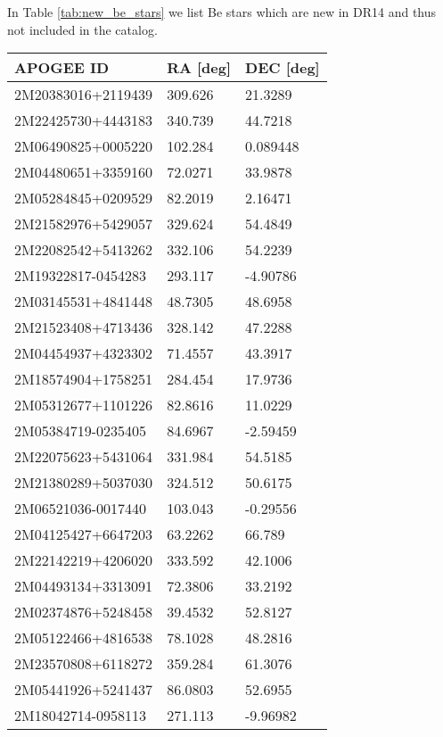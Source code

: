 \documentclass[fleqn,usenatbib]{mnras}
\begin{document}
In Table \ref{tab:new_be_stars} we list Be stars which are new in DR14 and thus not included in the \citet{chojnowski15} catalog. 

\begin{table*}
\centering
  \begin{tabular}{lll}
  \toprule
  APOGEE ID  &       RA [deg] &       DEC [deg]                                     \\
  \midrule
  2M20383016+2119439 &  309.626 &   21.3289 \\
  2M22425730+4443183 &  340.739 &   44.7218 \\
  2M06490825+0005220 &  102.284 &  0.089448 \\
  2M04480651+3359160 &  72.0271 &   33.9878 \\
  2M05284845+0209529 &  82.2019 &   2.16471 \\
  2M21582976+5429057 &  329.624 &   54.4849 \\
  2M22082542+5413262 &  332.106 &   54.2239 \\
  2M19322817-0454283 &  293.117 &  -4.90786 \\
  2M03145531+4841448 &  48.7305 &   48.6958 \\
  2M21523408+4713436 &  328.142 &   47.2288 \\
  2M04454937+4323302 &  71.4557 &   43.3917 \\
  2M18574904+1758251 &  284.454 &   17.9736 \\
  2M05312677+1101226 &  82.8616 &   11.0229 \\
  2M05384719-0235405 &  84.6967 &  -2.59459 \\
  2M22075623+5431064 &  331.984 &   54.5185 \\
  2M21380289+5037030 &  324.512 &   50.6175 \\
  2M06521036-0017440 &  103.043 &  -0.29556 \\
  2M04125427+6647203 &  63.2262 &    66.789 \\
  2M22142219+4206020 &  333.592 &   42.1006 \\
  2M04493134+3313091 &  72.3806 &   33.2192 \\
  2M02374876+5248458 &  39.4532 &   52.8127 \\
  2M05122466+4816538 &  78.1028 &   48.2816 \\
  2M23570808+6118272 &  359.284 &   61.3076 \\
  2M05441926+5241437 &  86.0803 &   52.6955 \\
  2M18042714-0958113 &  271.113 &  -9.96982 \\

\end{tabular}
\end{table*}
\end{document}
